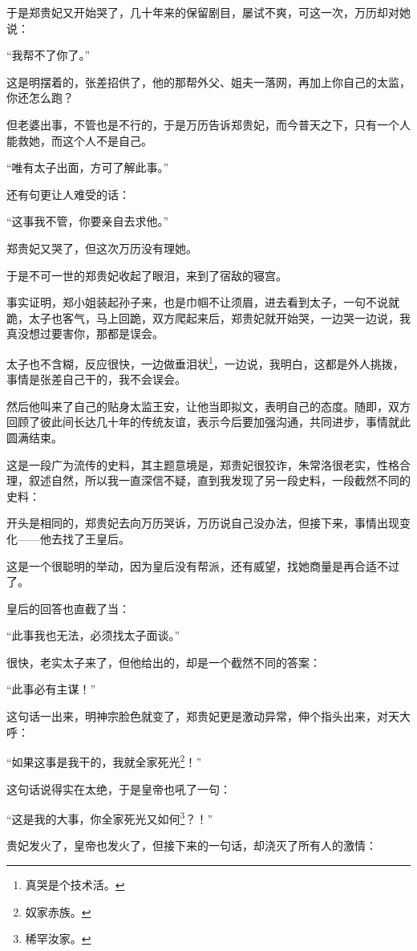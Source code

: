 \begin{multicols}{\theparacolNo}
		于是郑贵妃又开始哭了，几十年来的保留剧目，屡试不爽，可这一次，万历却对她说：

		“我帮不了你了。”

		这是明摆着的，张差招供了，他的那帮外父、姐夫一落网，再加上你自己的太监，你还怎么跑？

		但老婆出事，不管也是不行的，于是万历告诉郑贵妃，而今普天之下，只有一个人能救她，而这个人不是自己。

		“唯有太子出面，方可了解此事。”

		还有句更让人难受的话：

		“这事我不管，你要亲自去求他。”

		郑贵妃又哭了，但这次万历没有理她。

		于是不可一世的郑贵妃收起了眼泪，来到了宿敌的寝宫。

		事实证明，郑小姐装起孙子来，也是巾帼不让须眉，进去看到太子，一句不说就跪，太子也客气，马上回跪，双方爬起来后，郑贵妃就开始哭，一边哭一边说，我真没想过要害你，那都是误会。

		太子也不含糊，反应很快，一边做垂泪状\footnote{真哭是个技术活。}，一边说，我明白，这都是外人挑拨，事情是张差自己干的，我不会误会。

		然后他叫来了自己的贴身太监王安，让他当即拟文，表明自己的态度。随即，双方回顾了彼此间长达几十年的传统友谊，表示今后要加强沟通，共同进步，事情就此圆满结束。

		这是一段广为流传的史料，其主题意境是，郑贵妃很狡诈，朱常洛很老实，性格合理，叙述自然，所以我一直深信不疑，直到我发现了另一段史料，一段截然不同的史料：

		开头是相同的，郑贵妃去向万历哭诉，万历说自己没办法，但接下来，事情出现变化——他去找了王皇后。

		这是一个很聪明的举动，因为皇后没有帮派，还有威望，找她商量是再合适不过了。

		皇后的回答也直截了当：

		“此事我也无法，必须找太子面谈。”

		很快，老实太子来了，但他给出的，却是一个截然不同的答案：

		“此事必有主谋！”

		这句话一出来，明神宗脸色就变了，郑贵妃更是激动异常，伸个指头出来，对天大呼：

		“如果这事是我干的，我就全家死光\footnote{奴家赤族。}！”

		这句话说得实在太绝，于是皇帝也吼了一句：

		“这是我的大事，你全家死光又如何\footnote{稀罕汝家。}？！”

		贵妃发火了，皇帝也发火了，但接下来的一句话，却浇灭了所有人的激情：


\end{multicols}
